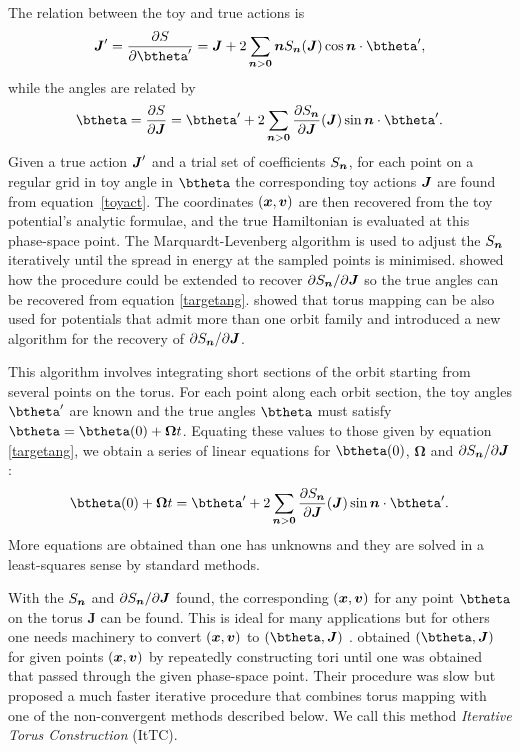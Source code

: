 \documentclass[useAMS,usenatbib,fleqn,a4paper]{mn2e}
\newcommand{\bs}[1]{\bmath{#1}}
\begin{document}
The relation between the toy and true
actions is
\begin{equation}
\bs{J}'=\frac{\partial S}{\partial \btheta'} = \bs{J}+2\sum_{\bs{n}>\bs{0}}\bs{n}S_{\bs{n}}(\bs{J})\cos\bs{n}\cdot\btheta',
\label{toyact}
\end{equation}
while the angles are related by
\begin{equation}
\btheta=\frac{\partial S}{\partial \bs{J}}
= \btheta'+2\sum_{\bs{n}>\bs{0}}\frac{\partial S_{\bs{n}}}{\partial \bs{J}}(\bs{J})\sin\bs{n}\cdot\btheta'.
\label{targetang}
\end{equation}
 Given a true action $\bs{J}'$ and a trial set of coefficients
$S_{\bs{n}}$, for each point on a regular grid in toy angle in $\btheta$ the
corresponding toy actions $\bs{J}$ are found from equation~\eqref{toyact}.
The coordinates $(\bs{x},\bs{v})$ are then recovered from the toy
potential's analytic formulae, and the true Hamiltonian is evaluated at
this phase-space point.  The Marquardt-Levenberg algorithm is used to adjust
the $S_{\bs{n}}$ iteratively until the spread in energy at the sampled points
is minimised. \cite{BinneyKumar} showed how the procedure could be extended
to recover $\partial S_{\bs{n}}/\partial\bs{J}$ so the true angles can be
recovered from equation \eqref{targetang}.  \cite{KaasalainenB} showed that
torus mapping can be also used for potentials that admit more than one orbit
family and introduced a new algorithm for the recovery of $\partial
S_{\bs{n}}/\partial\bs{J}$.

This algorithm involves integrating short sections of the orbit starting from
several points on the torus. For each point along each orbit section, the toy
angles $\btheta'$ are known and the true angles $\btheta$ must satisfy
$\btheta=\btheta(0)+\boldsymbol{\Omega}t$. Equating these values to those
given by equation \eqref{targetang}, we obtain a series of
linear equations for $\btheta(0)$, $\boldsymbol{\Omega}$ and $\partial
S_{\bs{n}}/\partial\bs{J}$:
\begin{equation}
\btheta(0)+\boldsymbol{\Omega}t
= \btheta'+2\sum_{\bs{n}>\bs{0}}\frac{\partial S_{\bs{n}}}{\partial \bs{J}}(\bs{J})\sin\bs{n}\cdot\btheta'.
\label{toyang}
\end{equation}
 More equations are obtained than one has unknowns and they are solved in a
least-squares sense by standard methods.

With the $S_{\bs{n}}$ and $\partial S_{\bs{n}}/\partial \bs{J}$ found, the
corresponding $(\bs{x},\bs{v})$ for any point $\btheta$ on the torus
$\boldsymbol{J}$ can be found. This is ideal for many applications but for
others one needs machinery to convert $(\bs{x},\bs{v})$ to
$(\btheta,\boldsymbol{J})$ \citep{McMillanBinney2013}.
\cite{McMillanBinney2008} obtained $(\btheta,\boldsymbol{J})$ for given
points $(\bs{x},\bs{v})$ by repeatedly constructing tori until one was
obtained that passed through the given phase-space point. Their procedure was
slow but \cite{SandersBinney2015} proposed a much faster iterative
procedure that combines torus mapping with one of the non-convergent methods
described below. We call this method \emph{Iterative Torus Construction} (ItTC).
\end{document}

